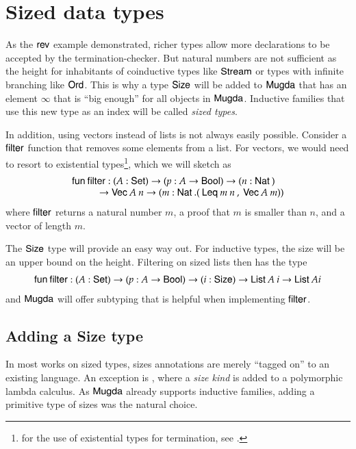 \chapter{Sized data types}

As the $\mathsf{rev}$ example demonstrated, richer types allow more declarations to be accepted by the termination-checker. 
But natural numbers are not sufficient as the height for inhabitants of coinductive types like $\mathsf{Stream}$ or types with infinite branching like $\mathsf{Ord}$.
This is why a type $\mathsf{Size}$ will be added to $\textsf{Mugda}$ that has an element $\infty$ that is ``big enough'' for all objects in $\textsf{Mugda}$.
Inductive families that use this new type as an index will be called \emph{sized types}. 

In addition, using vectors instead of lists is not always easily possible.
Consider a $\mathsf{filter}$ function that removes some elements from a list.
For vectors, we would need to resort to existential types\footnote{for the use of existential types for termination, see \cite{xi99dependent}.}, which we will sketch as
\[ \begin{array}{l} 
\fun \filter : (A : \Set ) \ra (p : A \ra \Bool ) \ra (n : \Nat ) \\
\spcx \ra \vVec A \: n \ra (m : \Nat . (\: \tLeq m \: n \:, \: \vVec A \: m))
\end{array}\]   
where  $\mathsf{filter}$ returns a natural number $m$, a proof that $m$ is smaller than $n$, and a vector of length $m$.

The $\mathsf{Size}$ type will provide an easy way out. For inductive types, the size will be an upper bound 
on the height. Filtering on sized lists then has the type 
\[
\begin{array}{l} 
\mathsf{fun}\: \mathsf{filter} : (A : \mathsf{Set} ) \rightarrow (p : A \rightarrow \mathsf{Bool} ) \rightarrow (i : \mathsf{Size} ) \rightarrow \mathsf{List}\: A \: i \rightarrow \mathsf{List}\: A i 
\end{array}   
\]
and $\textsf{Mugda}$ will offer subtyping that is helpful when implementing $\mathsf{filter}$.

\section{Adding a Size type}

In most works on sized types, sizes annotations are merely ``tagged on'' to an existing language. An exception is \cite{abel:PhD}, where a \emph{size kind} is added to a polymorphic lambda calculus. 
As $\textsf{Mugda}$ already supports inductive families, adding a primitive type of sizes was the natural choice. 

